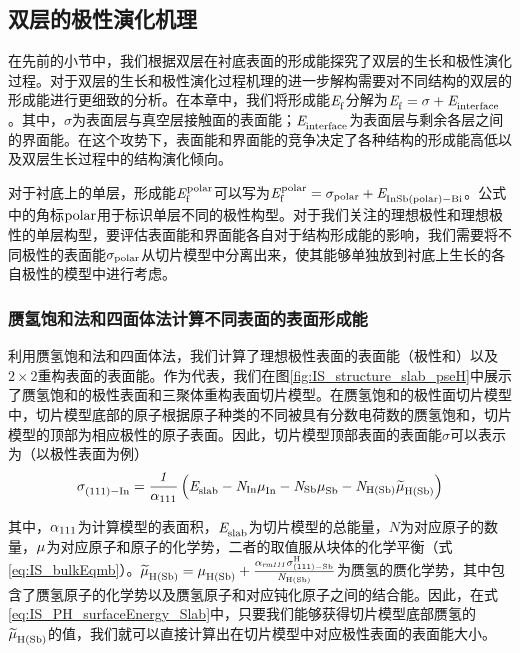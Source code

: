 \subsection{双层的极性演化机理}

在先前的小节中，我们根据双层在衬底表面的形成能探究了双层的生长和极性演化过程。对于双层的生长和极性演化过程机理的进一步解构需要对不同结构的双层的形成能进行更细致的分析。在本章中，我们将形成能$\it E_{\rm f}^{\rm } \it$分解为$\it E_{\rm f}^{\rm } \it=\sigma + \it E_{\rm interface}^{\rm } \it$。其中，$\sigma$为表面层与真空层接触面的表面能；$\it E_{\rm interface}^{\rm } \it$为表面层与剩余各层之间的界面能。在这个攻势下，表面能和界面能的竞争决定了各种结构的形成能高低以及双层生长过程中的结构演化倾向。

对于衬底上的单层，形成能$\it E_{\rm f}^{\rm polar} \it$可以写为$\it E_{\rm f}^{\rm polar} \it=\sigma_{\rm polar} + \it E_{\rm InSb\left(polar\right)-Bi}^{\rm } \it$。公式中的角标$\rm polar$用于标识单层不同的极性构型。对于我们关注的理想极性和理想极性的单层构型，要评估表面能和界面能各自对于结构形成能的影响，我们需要将不同极性的表面能$\sigma_{\rm polar}$从切片模型中分离出来，使其能够单独放到衬底上生长的各自极性的模型中进行考虑。

\subsubsection{赝氢饱和法和四面体法计算不同表面的表面形成能}
利用赝氢饱和法和四面体法，我们计算了理想极性表面的表面能（极性和）以及$2 \times 2$重构表面的表面能。作为代表，我们在图\ref{fig:IS_structure_slab_pseH}中展示了赝氢饱和的极性表面和三聚体重构表面切片模型。在赝氢饱和的极性面切片模型中，切片模型底部的原子根据原子种类的不同被具有分数电荷数的赝氢饱和，切片模型的顶部为相应极性的原子表面。因此，切片模型顶部表面的表面能$\sigma$可以表示为（以极性表面为例）\chinesecolon
\begin{equation}
    \label{eq:IS_PH_surfaceEnergy_Slab}
    \it \sigma_{\rm \left(111\right)-In}^{\rm } \it
    =\frac{1}{\alpha _{\rm 111}}\left(\it E_{\rm slab}^{\rm } \it-N_{\rm In}\it \mu_{\rm In}^{\rm } \it-N_{\rm Sb}\it \mu_{\rm Sb}^{\rm } \it-N_{\rm H\left(Sb\right)} \it \widetilde{\mu}_{\rm H\left(Sb\right)}^{\rm } \it \right)
\end{equation}

其中，$\alpha _{\rm 111}$为计算模型的表面积，$\it E_{\rm slab}^{\rm } \it$为切片模型的总能量，$N$为对应原子的数量，$\it \mu_{\rm }^{\rm } \it$为对应原子和原子的化学势，二者的取值服从块体的化学平衡（式\ref{eq:IS_bulkEqmb}）。$\it \widetilde{\mu}_{\rm H\left(Sb\right)}^{\rm } \it=\it \mu_{\rm H\left(Sb\right)}^{\rm } \it+\frac{\alpha _{rm 111}\sigma_{\rm \left(111\right)-Sb}^{\rm H}}{N_{\rm H\left(Sb\right)}}$为赝氢的赝化学势，其中包含了赝氢原子的化学势以及赝氢原子和对应钝化原子之间的结合能。因此，在式\ref{eq:IS_PH_surfaceEnergy_Slab}中，只要我们能够获得切片模型底部赝氢的$\it \widetilde{\mu}_{\rm H\left(Sb\right)}^{\rm } \it$的值，我们就可以直接计算出在切片模型中对应极性表面的表面能大小。

